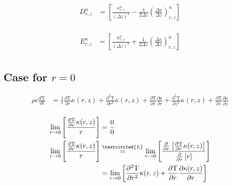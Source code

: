 \documentclass[12pt]{article}
\begin{document}
		\begin{equation}
		\begin{aligned}
		D^n_{r, z} &= \left [\frac{\kappa^n_{r, z}}{(\Delta z)^2} - \frac{1}{2\Delta z}(\frac{\Delta\kappa}{\Delta z})^n_{r, z}  \right ] \\
		\end{aligned}
		\end{equation}
		
		\begin{equation}
		\begin{aligned}
		E^n_{r, z} &= \left [ \frac{\kappa^n_{r, z}}{(\Delta z)^2} + \frac{1}{2\Delta z}(\frac{\Delta\kappa}{\Delta z})^n_{r, z} \right ] \\
		\end{aligned}
		\end{equation}

    \subsection{Case for $r=0$}
      \begin{equation}
        \begin{aligned}
          \rho c \frac{d\mathrm{T}}{dt} &= \frac{1}{r} \frac{\partial\mathrm{T}}{\partial r}\kappa(r, z) + \frac{\partial^2\mathrm{T}}{\partial r^2}\kappa(r, z)  + \frac{\partial\mathrm{T}}{\partial r} \frac{\partial\mathrm{\kappa}}{\partial r}  + \frac{\partial^2\mathrm{T}}{\partial z^2}\kappa(r, z) + \frac{\partial\mathrm{T}}{\partial z}\frac{\partial\mathrm{\kappa}}{\partial z} \\
        \end{aligned}
      \end{equation}	

      \begin{equation}
        \begin{aligned}
          \lim_{r\rightarrow 0} \left [ \frac{\frac{\partial\mathrm{T}}{\partial r}\kappa(r, z)}{r} \right ] &= \frac{0}{0} \\
          \lim_{r\rightarrow 0} \left [ \frac{\frac{\partial\mathrm{T}}{\partial r}\kappa(r, z)}{r} \right ] &\overset{\textcircled{L}}= \lim_{r\rightarrow 0} \left [ \frac{\frac{\partial}{\partial r} \left [\frac{\partial\mathrm{T}}{\partial r}\kappa(r, z)  \right ]}{\frac{\partial}{\partial r}\left [ r \right ]} \right ] \\
          &= \lim_{r\rightarrow 0} \left [ \frac{\partial^2\mathrm{T}}{\partial r^2}\kappa(r, z)  + \frac{\partial\mathrm{T}}{\partial r}\frac{\partial\kappa(r, z)}{\partial r}\right ] \\
        \end{aligned}
      \end{equation}
\end{document}
